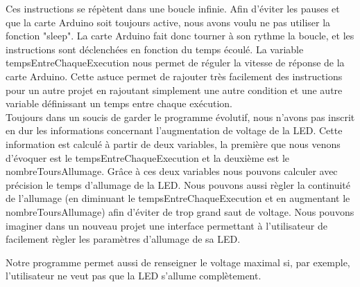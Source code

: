 	Ces instructions se répètent dans une boucle infinie. Afin d'éviter les pauses et que la carte Arduino soit toujours active, nous avons voulu ne pas utiliser la fonction "sleep". La carte Arduino fait donc tourner à son rythme la boucle, et les instructions sont déclenchées en fonction du temps écoulé. La variable tempsEntreChaqueExecution nous permet de réguler la vitesse de réponse de la carte Arduino. Cette astuce permet de rajouter très facilement des instructions pour un autre projet en rajoutant simplement une autre condition et une autre variable définissant un temps entre chaque exécution.\\

	Toujours dans un soucis de garder le programme évolutif, nous n'avons pas inscrit en dur les informations concernant l'augmentation de voltage de la LED. Cette information est calculé à partir de deux variables, la première que nous venons d'évoquer est le tempsEntreChaqueExecution et la deuxième est le nombreToursAllumage. Grâce à ces deux variables nous pouvons calculer avec précision le temps d'allumage de la LED. Nous pouvons aussi règler la continuité de l'allumage (en diminuant le tempsEntreChaqueExecution et en augmentant le nombreToursAllumage) afin d'éviter de trop grand saut de voltage. Nous pouvons imaginer dans un nouveau projet une interface permettant à l'utilisateur de facilement règler les paramètres d'allumage de sa LED.

	Notre programme permet aussi de renseigner le voltage maximal si, par exemple, l'utilisateur ne veut pas que la LED s'allume complètement.